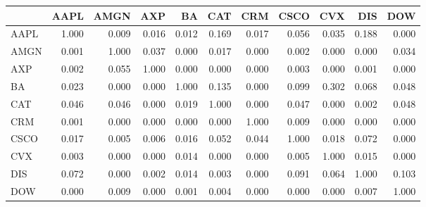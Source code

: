 \begin{tabular}{lrrrrrrrrrr}
\toprule
{} &   AAPL &   AMGN &    AXP &     BA &    CAT &    CRM &   CSCO &    CVX &    DIS &    DOW \\
\midrule
AAPL &  1.000 &  0.009 &  0.016 &  0.012 &  0.169 &  0.017 &  0.056 &  0.035 &  0.188 &  0.000 \\
AMGN &  0.001 &  1.000 &  0.037 &  0.000 &  0.017 &  0.000 &  0.002 &  0.000 &  0.000 &  0.034 \\
AXP  &  0.002 &  0.055 &  1.000 &  0.000 &  0.000 &  0.000 &  0.003 &  0.000 &  0.001 &  0.000 \\
BA   &  0.023 &  0.000 &  0.000 &  1.000 &  0.135 &  0.000 &  0.099 &  0.302 &  0.068 &  0.048 \\
CAT  &  0.046 &  0.046 &  0.000 &  0.019 &  1.000 &  0.000 &  0.047 &  0.000 &  0.002 &  0.048 \\
CRM  &  0.001 &  0.000 &  0.000 &  0.000 &  0.000 &  1.000 &  0.009 &  0.000 &  0.000 &  0.000 \\
CSCO &  0.017 &  0.005 &  0.006 &  0.016 &  0.052 &  0.044 &  1.000 &  0.018 &  0.072 &  0.000 \\
CVX  &  0.003 &  0.000 &  0.000 &  0.014 &  0.000 &  0.000 &  0.005 &  1.000 &  0.015 &  0.000 \\
DIS  &  0.072 &  0.000 &  0.002 &  0.014 &  0.003 &  0.000 &  0.091 &  0.064 &  1.000 &  0.103 \\
DOW  &  0.000 &  0.009 &  0.000 &  0.001 &  0.004 &  0.000 &  0.000 &  0.000 &  0.007 &  1.000 \\
\bottomrule
\end{tabular}
